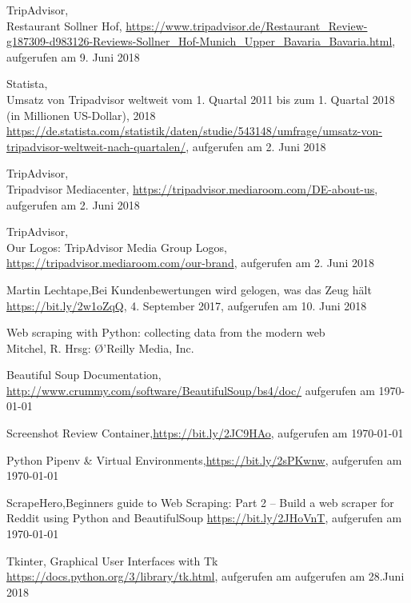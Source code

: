 \documentclass[a4paper,oneside,12pt]{report}
\begin{document}
\begin{thebibliography}{9}
		 TripAdvisor,\\ 
		Restaurant Sollner Hof, \url{https://www.tripadvisor.de/Restaurant_Review-g187309-d983126-Reviews-Sollner_Hof-Munich_Upper_Bavaria_Bavaria.html}, aufgerufen am 9. Juni 2018
		
		
		 Statista,\\ Umsatz von Tripadvisor weltweit vom 1. Quartal 2011 bis zum 1. Quartal 2018 (in Millionen US-Dollar), 2018 \url{https://de.statista.com/statistik/daten/studie/543148/umfrage/umsatz-von-tripadvisor-weltweit-nach-quartalen/}, aufgerufen am 2. Juni 2018
		
		 TripAdvisor,\\Tripadvisor Mediacenter, \url{https://tripadvisor.mediaroom.com/DE-about-us}, aufgerufen am 2. Juni 2018
		
		 TripAdvisor,\\ Our Logos: TripAdvisor Media Group Logos, \url{https://tripadvisor.mediaroom.com/our-brand}, aufgerufen am 2. Juni 2018
		
		 Martin Lechtape,\newline Bei Kundenbewertungen wird gelogen, was das Zeug hält \url{https://bit.ly/2w1oZqQ}, 4. September 2017, aufgerufen am 10. Juni 2018
		
		 Web scraping with Python: collecting data from the modern web\\ Mitchel, R. Hrsg: \O'Reilly Media, Inc.
		
		 Beautiful Soup Documentation, \newline \url{http://www.crummy.com/software/BeautifulSoup/bs4/doc/} aufgerufen am \today
		
		 Screenshot Review Container,\newline \url{https://bit.ly/2JC9HAo}, aufgerufen am \today
		
		 Python Pipenv \& Virtual Environments,\newline \url{https://bit.ly/2sPKwnw}, aufgerufen am \today
		
		 ScrapeHero,\newline Beginners guide to Web Scraping: Part 2 – Build a web scraper for Reddit using Python and BeautifulSoup \newline \url{https://bit.ly/2JHoVnT}, aufgerufen am \today
		
		 Tkinter, \newline
		Graphical User Interfaces with Tk\\
		\url{https://docs.python.org/3/library/tk.html}, aufgerufen am aufgerufen am 28.Juni 2018
		
	\end{thebibliography}
	
\end{document}
